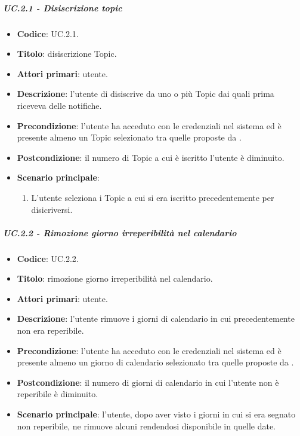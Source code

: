 	
	\subparagraph{UC\theuccount.2.1 - Disiscrizione topic}
	\begin{itemize}
		\item \textbf{Codice}: UC\theuccount.2.1.
		\item \textbf{Titolo}: disiscrizione Topic.
		\item \textbf{Attori primari}: utente.
		\item \textbf{Descrizione}: l'utente di disiscrive da uno o più Topic dai quali prima riceveva delle notifiche.
		\item \textbf{Precondizione}: l'utente ha acceduto con le credenziali nel sistema ed è presente almeno un Topic selezionato tra quelle proposte da \progetto.
		\item \textbf{Postcondizione}: il numero di Topic a cui è iscritto l'utente è diminuito.
		\item \textbf{Scenario principale}:
		\begin{enumerate}
			\item L'utente seleziona i Topic a cui si era iscritto precedentemente per disicriversi.
		\end{enumerate}
	\end{itemize}
	
			
	\subparagraph{UC\theuccount.2.2 - Rimozione giorno irreperibilità nel calendario}
	\begin{itemize}
		\item \textbf{Codice}: UC\theuccount.2.2.
		\item \textbf{Titolo}: rimozione giorno irreperibilità nel calendario.
		\item \textbf{Attori primari}: utente.
		\item \textbf{Descrizione}: l'utente rimuove i giorni di calendario in cui precedentemente non era reperibile.
		\item \textbf{Precondizione}: l'utente ha acceduto con le credenziali nel sistema ed è presente almeno un giorno di calendario selezionato tra quelle proposte da \progetto.
		\item \textbf{Postcondizione}: il numero di giorni di calendario in cui l'utente non è reperibile è diminuito.
		\item \textbf{Scenario principale}: l'utente, dopo aver visto i giorni in cui si era segnato non reperibile, ne rimuove alcuni rendendosi disponibile in quelle date.
	\end{itemize}
			
